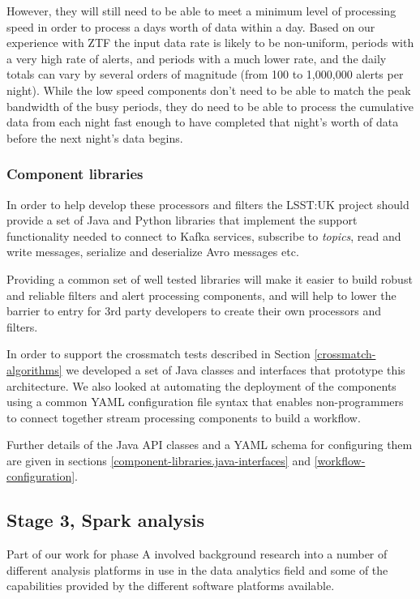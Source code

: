 \documentclass{article}
\newcommand{\yaml} {YAML\xspace}
\newcommand{\avro} {Avro\xspace}
\newcommand{\kafka} {Kafka\xspace}
\newcommand{\kftopics} {\textit{topics}\xspace}
\newcommand{\crossmatch} {crossmatch\xspace}
\newcommand{\serz}      {serialize\xspace}
\newcommand{\deserz}    {deserialize\xspace}
\newcommand{\phasea} {phase A\xspace}
\newcommand{\ztf} {ZTF\xspace}
\newcommand{\lsstuk} {LSST:UK\xspace}
\begin{document}
However, they will still need to be able to meet a minimum level of processing speed in order to process a days worth of data within a day. Based on our experience with \ztf the input data rate is likely to be non-uniform, periods with a very high rate of alerts, and periods with a much lower rate, and the daily totals can vary by several orders of magnitude (from 100 to 1,000,000 alerts per night).
While the low speed components don't need to be able to match the peak bandwidth of the busy periods, they do need to be able to process the cumulative data from each night fast enough to have completed that night's worth of data before the next night's data begins.

\subsubsection{Component libraries}
\label{stage-2.component-libraries}

In order to help develop these processors and filters the \lsstuk project should provide a set of Java and Python libraries that implement the support functionality needed to connect to \kafka services, subscribe to \kftopics, read and write messages, \serz and \deserz \avro messages etc.

Providing a common set of well tested libraries will make it easier to build robust and reliable filters and alert processing components, and  will help to lower the barrier to entry for 3rd party developers to create their own processors and filters.

In order to support the \crossmatch tests described in Section \ref{crossmatch-algorithms} we developed a set of Java classes and interfaces that prototype this architecture.
We also looked at automating the deployment of the components using a common \yaml configuration file syntax that enables non-programmers to connect together stream processing components to build a workflow.

Further details of the Java API classes and a YAML schema for configuring them are given in sections \ref{component-libraries.java-interfaces} and \ref{workflow-configuration}.

\subsection{Stage 3, Spark analysis}
\label{stage-3}

Part of our work for \phasea involved background research into a number of different analysis platforms in use in the data analytics field and some of the capabilities provided by the different software platforms available.
\end{document}
